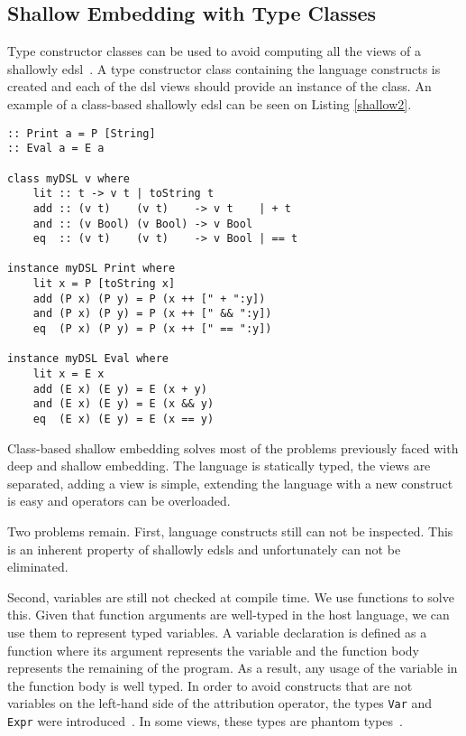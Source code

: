 \subsection{Shallow Embedding with Type Classes}\label{sec:class_based_edsl}

Type constructor classes can be used to avoid computing all the views of a shallowly \ac{edsl}~\cite{tagless}. A type constructor class containing the language constructs is created and each of the \ac{dsl} views should provide an instance of the class. An example of a class-based shallowly \ac{edsl} can be seen on Listing \ref{shallow2}.

\begin{lstlisting}[caption=A simple class-based shallowly \ac{edsl},captionpos=b,label=shallow2]
:: Print a = P [String]
:: Eval a = E a

class myDSL v where
    lit :: t -> v t | toString t
    add :: (v t)    (v t)    -> v t    | + t
    and :: (v Bool) (v Bool) -> v Bool
    eq  :: (v t)    (v t)    -> v Bool | == t
    
instance myDSL Print where
    lit x = P [toString x]
    add (P x) (P y) = P (x ++ [" + ":y])
    and (P x) (P y) = P (x ++ [" && ":y])
    eq  (P x) (P y) = P (x ++ [" == ":y])
    
instance myDSL Eval where
    lit x = E x
    add (E x) (E y) = E (x + y)
    and (E x) (E y) = E (x && y)
    eq  (E x) (E y) = E (x == y)
\end{lstlisting}

Class-based shallow embedding solves most of the problems previously faced with deep and shallow embedding. The language is statically typed, the views are separated, adding a view is simple, extending the language with a new construct is easy and operators can be overloaded. 

Two problems remain. First, language constructs still can not be inspected. This is an inherent property of shallowly \acp{edsl} and unfortunately can not be eliminated. 

Second, variables are still not checked at compile time. We use functions to solve this. Given that function arguments are well-typed in the host language, we can use them to represent typed variables. A variable declaration is defined as a function where its argument represents the variable and the function body represents the remaining of the program. As a result, any usage of the variable in the function body is well typed. In order to avoid constructs that are not variables on the left-hand side of the attribution operator, the types \texttt{Var} and \texttt{Expr} were introduced~\cite{mtasks}. In some views, these types are phantom types~\cite{phantom}. 


